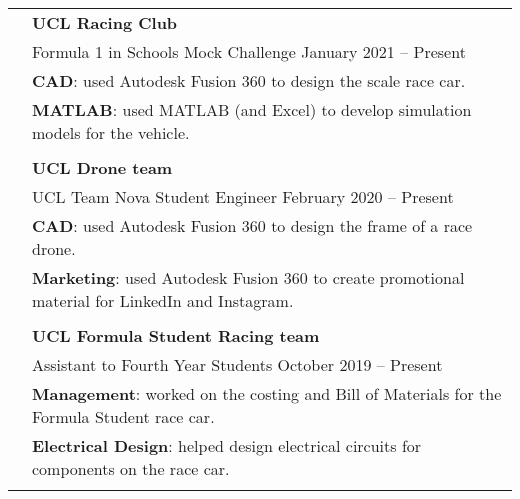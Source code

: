 \documentclass[letterpaper, 11pt]{article}
\begin{document}
\begin{longtable}{p{1.3in}p{4.8in}}



\nohyphens{\color{OliveGreen}{Relevant experience}} 
& \textbf{UCL Racing Club} \\
& Formula 1 in Schools Mock Challenge \hfill January 2021 -- Present \\
& \textbf{CAD}: used Autodesk Fusion 360 to design the scale race car. \\
& \textbf{MATLAB}: used MATLAB (and Excel) to develop simulation models for the vehicle. \\
& \\

& \textbf{UCL Drone team} \\
& UCL Team Nova Student Engineer \hfill February 2020 -- Present \\
& \textbf{CAD}: used Autodesk Fusion 360 to design the frame of a race drone. \\
& \textbf{Marketing}: used Autodesk Fusion 360 to create promotional material for LinkedIn and Instagram. \\
& \\

& \textbf{UCL Formula Student Racing team} \\
& Assistant to Fourth Year Students \hfill October 2019 -- Present \\
& \textbf{Management}: worked on the costing and Bill of Materials for the Formula Student race car. \\
& \textbf{Electrical Design}: helped design electrical circuits for components on the race car. \\
& \\



\end{longtable}
\end{document}
